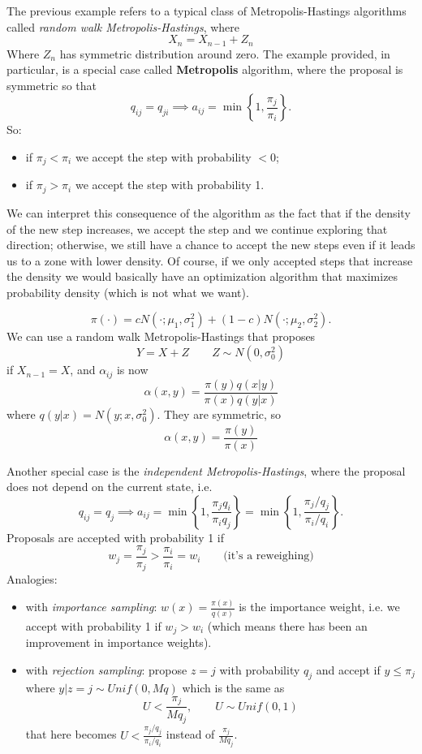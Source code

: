 \documentclass{article}
\begin{document}
The previous example refers to a typical class of Metropolis-Hastings algorithms called \textit{random walk Metropolis-Hastings}, where
\[
X_n=X_{n-1}+Z_n
\]
Where $Z_n$ has symmetric distribution around zero. The example provided, in particular, is a special case called \textbf{Metropolis} algorithm, where the proposal is symmetric so that
\[
q_{ij}=q_{ji}\implies a_{ij}=\min\left\{1,\frac{\pi_j}{\pi_i}\right\}.
\]
So:
\begin{itemize}
    \item if $\pi_j<\pi_i$ we accept the step with probability $<0$;
    \item if $\pi_j>\pi_i$ we accept the step with probability 1.
\end{itemize}

We can interpret this consequence of the algorithm as the fact that if the density of the new step increases, we accept the step and we continue exploring that direction; otherwise, we still have a chance to accept the new steps even if it leads us to a zone with lower density. Of course, if we only accepted steps that increase the density we would basically have an optimization algorithm that maximizes probability density (which is not what we want).
\begin{example}
    \[
\pi(\cdot)=cN(\cdot;\mu_1,\sigma_1^2)+(1-c)N(\cdot;\mu_2,\sigma_2^2).
\]
We can use a random walk Metropolis-Hastings that proposes
\[
Y=X+Z\qquad Z\sim N(0,\sigma_0^2)
\]
if $X_{n-1}=X$, and $\alpha_{ij}$ is now
\[
\alpha(x,y)=\frac{\pi(y)q(x|y)}{\pi(x)q(y|x)}
\]
where $q(y|x)=N(y;x,\sigma_0^2)$. They are symmetric, so
\[
\alpha(x,y)=\frac{\pi(y)}{\pi(x)}
\]
\end{example}
Another special case is the \textit{independent Metropolis-Hastings}, where the proposal does not depend on the current state, i.e.
\[
q_{ij}=q_j\implies a_{ij}=\min\left\{1,\frac{\pi_jq_i}{\pi_iq_j}\right\}=\min\left\{1,\frac{\pi_j/q_j}{\pi_i/q_i}\right\}.
\]
Proposals are accepted with probability 1 if
\[
w_j=\frac{\pi_j}{\pi_j}>\frac{\pi_i}{\pi_i}=w_i\qquad\text{(it's a reweighing)}
\]
Analogies:
\begin{itemize}
    \item with \textit{importance sampling}: $w(x)=\frac{\pi(x)}{q(x)}$ is the importance weight, i.e. we accept with probability 1 if $w_j>w_i$ (which means there has been an improvement in importance weights).
    \item with \textit{rejection sampling}: propose $z=j$ with probability $q_j$ and accept if $y\leqslant\pi_j$ where $y|z=j\sim Unif(0,Mq)$ which is the same as \[
    U<\frac{\pi_j}{Mq_j},\qquad U\sim Unif(0,1)
    \]
    that here becomes $U<\frac{\pi_j/q_j}{\pi_i/q_i}$ instead of $\frac{\pi_j}{Mq_j}$.
\end{itemize}
\end{document}
